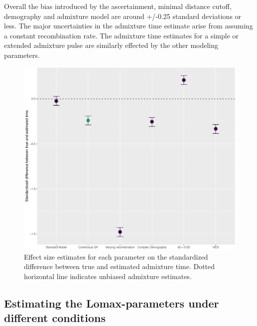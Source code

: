 \documentclass[]{article}
\begin{document}
Overall the bias introduced by the ascertainment, minimal distance
cutoff, demography and admixture model are  around +/-0.25 standard deviations or less. The major uncertainties in the admixture time
estimate arise from assuming a constant recombination rate. The
admixture time estimates for a simple or extended admixture pulse are similarly effected by the other modeling parameters.

\begin{figure}
\centering
\includegraphics{Admixture_Time_Inference_Paper_Draft_files/figure-latex/fig3-1.pdf}
\caption{\label{fig:fig3} Effect size estimates for each parameter on the standardized difference between true and estimated admixture time. Dotted horizontal line indicates unbiased admixture estimates.}
\end{figure}

\subsection{Estimating the Lomax-parameters under different conditions}\label{estimating the Lomax-parameters under different conditions}
\end{document}
